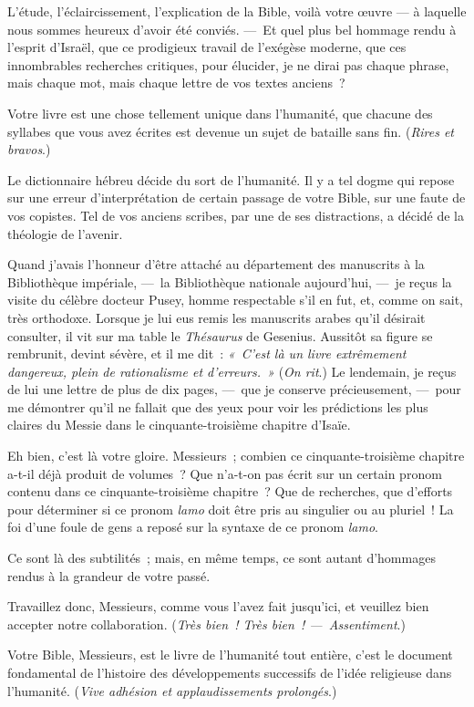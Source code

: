 \documentclass[french,twoside]{book} %
\newcommand\orgName[1]{#1}
\newcommand\persName[1]{#1}
\begin{document}
L’étude, l’éclaircissement, l’explication de la Bible, voilà votre œuvre — à laquelle nous sommes heureux d’avoir été conviés. — Et quel plus bel hommage rendu à l’esprit d’{\orgName Israël}, que ce prodigieux travail de l’exégèse moderne, que ces innombrables recherches critiques, pour élucider, je ne dirai pas chaque phrase, mais chaque mot, mais chaque lettre de vos textes anciens ?\par
Votre livre est une chose tellement unique dans l’humanité, que chacune des syllabes que vous avez écrites est devenue un sujet de bataille sans fin. ({\itshape Rires et bravos}.)\par
Le dictionnaire hébreu décide du sort de l’humanité. Il y a tel dogme qui repose sur une erreur d’interprétation de certain passage de votre Bible, sur une faute de vos copistes. Tel de vos anciens scribes, par une de ses distractions, a décidé de la théologie de l’avenir.\par
Quand j’avais l’honneur d’être attaché au département des manuscrits à la {\orgName Bibliothèque impériale}, — la {\orgName Bibliothèque nationale} aujourd’hui, — je reçus la visite du célèbre {\persName docteur Pusey}, homme respectable s’il en fut, et, comme on sait, très orthodoxe. Lorsque je lui eus remis les manuscrits arabes qu’il désirait consulter, il vit sur ma table le \emph{Thésaurus} de {\persName Gesenius}. Aussitôt sa figure se rembrunit, devint sévère, et il me dit : \emph{« C’est là un livre extrêmement dangereux, plein de rationalisme et d’erreurs. »} ({\itshape On rit}.) Le lendemain, je reçus de lui une lettre de plus de dix pages, — que je conserve précieusement, — pour me démontrer qu’il ne fallait que des yeux pour voir les prédictions les plus claires du {\persName Messie} dans le cinquante-troisième chapitre d’{\persName Isaïe}.\par
Eh bien, c’est là votre gloire. Messieurs ; combien ce cinquante-troisième chapitre a-t-il déjà produit de volumes ? Que n’a-t-on pas écrit sur un certain pronom contenu dans ce cinquante-troisième chapitre ? Que de recherches, que d’efforts pour déterminer si ce pronom {\itshape lamo} doit être pris au singulier ou au pluriel ! La foi d’une foule de gens a reposé sur la syntaxe de ce pronom {\itshape lamo}.\par
Ce sont là des subtilités ; mais, en même temps, ce sont autant d’hommages rendus à la grandeur de votre passé.\par
Travaillez donc, Messieurs, comme vous l’avez fait jusqu’ici, et veuillez bien accepter notre collaboration. ({\itshape Très bien ! Très bien ! — Assentiment}.)\par
Votre Bible, Messieurs, est le livre de l’humanité tout entière, c’est le document fondamental de l’histoire des développements successifs de l’idée religieuse dans l’humanité. ({\itshape Vive adhésion et applaudissements prolongés}.)
\end{document}
